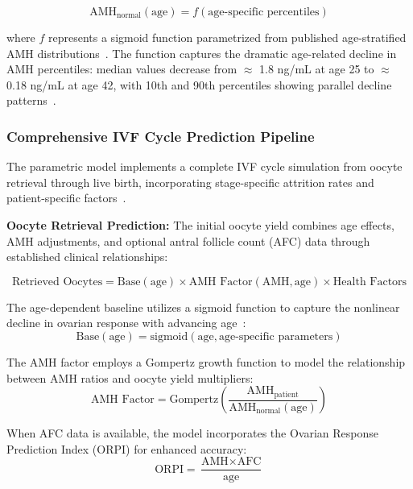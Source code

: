 \begin{equation}
\text{AMH}_{\text{normal}}(\text{age}) = f(\text{age-specific percentiles})
\end{equation}

where $f$ represents a sigmoid function parametrized from published age-stratified AMH distributions~\cite{lee2017amh}. The function captures the dramatic age-related decline in AMH percentiles: median values decrease from $\approx$ 1.8 ng/mL at age 25 to $\approx$ 0.18 ng/mL at age 42, with 10th and 90th percentiles showing parallel decline patterns~\cite{lee2017amh}.

\subsubsection{Comprehensive IVF Cycle Prediction Pipeline}

The parametric model implements a complete IVF cycle simulation from oocyte retrieval through live birth, incorporating stage-specific attrition rates and patient-specific factors~\cite{seifer2002amh,ovarian_reserve_testing}.

\textbf{Oocyte Retrieval Prediction:}
The initial oocyte yield combines age effects, AMH adjustments, and optional antral follicle count (AFC) data through established clinical relationships:

\begin{equation}
\text{Retrieved Oocytes} = \text{Base}(\text{age}) \times \text{AMH Factor}(\text{AMH}, \text{age}) \times \text{Health Factors}
\end{equation}

The age-dependent baseline utilizes a sigmoid function to capture the nonlinear decline in ovarian response with advancing age~\cite{acog2017advanced}:
\begin{equation}
\text{Base}(\text{age}) = \text{sigmoid}(\text{age}, \text{age-specific parameters})
\end{equation}

The AMH factor employs a Gompertz growth function to model the relationship between AMH ratios and oocyte yield multipliers:
\begin{equation}
\text{AMH Factor} = \text{Gompertz}\left(\frac{\text{AMH}_{\text{patient}}}{\text{AMH}_{\text{normal}}(\text{age})}\right)
\end{equation}

When AFC data is available, the model incorporates the Ovarian Response Prediction Index (ORPI) for enhanced accuracy:
\begin{equation}
\text{ORPI} = \frac{\text{AMH} \times \text{AFC}}{\text{age}}
\end{equation}


